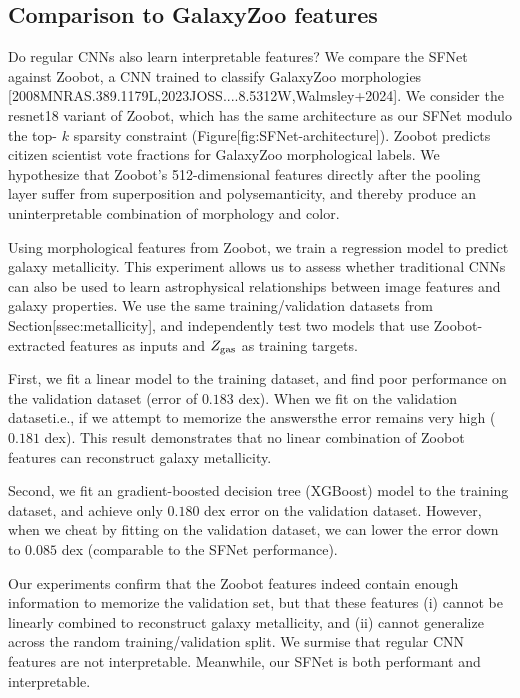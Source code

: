 \documentclass[11pt,a4paper]{article}
\begin{document}
\subsection{Comparison to GalaxyZoo features}

Do regular CNNs also learn interpretable features? We compare the SFNet against Zoobot, a CNN trained to classify GalaxyZoo morphologies [2008MNRAS.389.1179L,2023JOSS....8.5312W,Walmsley+2024]. We consider the resnet18 variant of Zoobot, which has the same architecture as our SFNet modulo the top- $k$  sparsity constraint (Figure[fig:SFNet-architecture]). Zoobot predicts citizen scientist vote fractions for GalaxyZoo morphological labels. We hypothesize that Zoobot's 512-dimensional features directly after the pooling layer suffer from superposition and polysemanticity, and thereby produce an uninterpretable combination of morphology and color.

Using morphological features from Zoobot, we train a regression model to predict galaxy metallicity. This experiment allows us to assess whether traditional CNNs can also be used to learn astrophysical relationships between image features and galaxy properties.  We use the same training/validation datasets from Section[ssec:metallicity], and independently test two models that use Zoobot-extracted features as inputs and  $Z_{\rm gas}$  as training targets.

First, we fit a linear model to the training dataset, and find poor performance on the validation dataset (error of  $0.183$ dex). When we fit on the validation dataseti.e., if we attempt to memorize the answersthe error remains very high ( $0.181$ dex). This result demonstrates that no linear combination of Zoobot features can reconstruct galaxy metallicity.

Second, we fit an gradient-boosted decision tree (XGBoost) model to the training dataset, and achieve only  $0.180$ dex error on the validation dataset. However, when we cheat by fitting on the validation dataset, we can lower the error down to  $0.085$ dex (comparable to the SFNet performance).

Our experiments confirm that the Zoobot features indeed contain enough information to memorize the validation set, but that these features (i) cannot be linearly combined to reconstruct galaxy metallicity, and (ii) cannot generalize across the random training/validation split. We surmise that regular CNN features are not interpretable. Meanwhile, our SFNet is both performant and interpretable.
\end{document}
